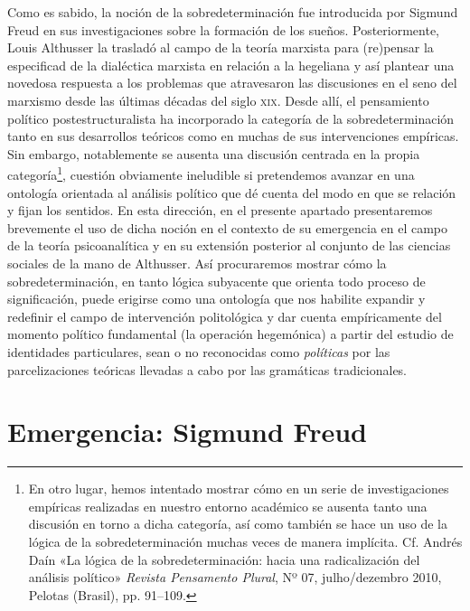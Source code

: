 Como es sabido, la noción de la sobredeterminación fue introducida por Sigmund Freud en sus investigaciones sobre la formación de los sueños. Posteriormente, Louis Althusser la trasladó al campo de la teoría marxista para (re)pensar la especificad de la dialéctica marxista en relación a la hegeliana y así plantear una novedosa respuesta a los problemas que atravesaron las discusiones en el seno del marxismo desde las últimas décadas del siglo \textsc{xix}. Desde allí, el pensamiento político postestructuralista ha incorporado la categoría de la sobredeterminación tanto en sus desarrollos teóricos como en muchas de sus intervenciones empíricas. Sin embargo, notablemente se ausenta una discusión centrada en la propia categoría\footnote{En otro lugar, hemos intentado mostrar cómo en un serie de investigaciones empíricas realizadas en nuestro entorno académico se ausenta tanto una discusión en torno a dicha categoría, así como también se hace un uso de la lógica de la sobredeterminación muchas veces de manera implícita. Cf. Andrés Daín «La lógica de la sobredeterminación: hacia una radicalización del análisis político» \emph{Revista Pensamento Plural}, Nº 07, julho/dezembro 2010, Pelotas (Brasil), pp. 91--109.}, cuestión obviamente ineludible si pretendemos avanzar en una ontología orientada al análisis político que dé cuenta del modo en que se relación y fijan los sentidos. En esta dirección, en el presente apartado presentaremos brevemente el uso de dicha noción en el contexto de su emergencia en el campo de la teoría psicoanalítica y en su extensión posterior al conjunto de las ciencias sociales de la mano de Althusser. Así procuraremos mostrar cómo la sobredeterminación, en tanto lógica subyacente que orienta todo proceso de significación, puede erigirse como una ontología que nos habilite expandir y redefinir el campo de intervención politológica y dar cuenta empíricamente del momento político fundamental (la operación hegemónica) a partir del estudio de identidades particulares, sean o no reconocidas como \emph{políticas} por las parcelizaciones teóricas llevadas a cabo por las gramáticas tradicionales.


\section{Emergencia: Sigmund Freud}

